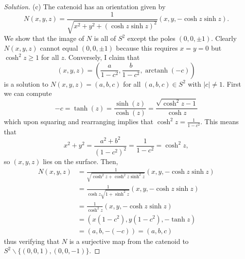 \documentclass[10pt]{scrartcl}
\providecommand{\setdiff}{\smallsetminus}
\newenvironment{soln}{\begin{proof}[Solution]}{\end{proof}}
\begin{document}
\begin{soln}
	(c) The catenoid has an orientation given by
	\[N(x,y,z) = \frac{1}{\sqrt{x^2 + y^2 + (\cosh z\sinh z)^2}}
	(x,y,-\cosh z\sinh z).\]
	We show that the image of $N$ is all of $S^2$ except the poles $(0,0,\pm1)$.
	Clearly $N(x,y,z)$ cannot equal $(0,0,\pm1)$ because this requires
	$x=y=0$ but $\cosh^2z \ge 1$ for all $z$.
	Conversely, I claim that
	\[(x,y,z) = \left(\frac{a}{1-c^2}, \frac{b}{1-c^2},
	\operatorname{arctanh}(-c)\right)\]
	is a solution to $N(x,y,z)=(a,b,c)$ for all $(a,b,c)\in S^2$ with $|c|\ne1$.
	First we can compute
	\[-c = \tanh(z) = \frac{\sinh(z)}{\cosh(z)}
	= \frac{\sqrt{\cosh^2z - 1}}{\cosh z}\]
	which upon squaring and rearranging implies that $\cosh^2z=\frac{1}{1-c^2}$.
	This means that
	\[x^2 + y^2 = \frac{a^2 + b^2}{(1-c^2)^2} = \frac{1}{1-c^2}
	= \cosh^2z,\]
	so $(x,y,z)$ lies on the surface. Then,
	\begin{align*}
		N(x,y,z) &=
		\frac{1}{\sqrt{\cosh^2z + \cosh^2z\sinh^2z}}(x,y,-\cosh z\sinh z)\\
		&= \frac{1}{\cosh z\sqrt{1 + \sinh ^2 z}}(x,y,-\cosh z\sinh z)\\
		&= \frac{1}{\cosh^2 z}(x,y,-\cosh z\sinh z)\\
		&= \left(x(1-c^2), y(1-c^2), -\tanh z\right)\\
		&= (a,b,-(-c)) = (a,b,c)
	\end{align*}
	thus verifying that $N$ is a surjective map from the catenoid to $S^2
	\setdiff\{(0,0,1),(0,0,-1)\}$.
\end{soln}
\end{document}

